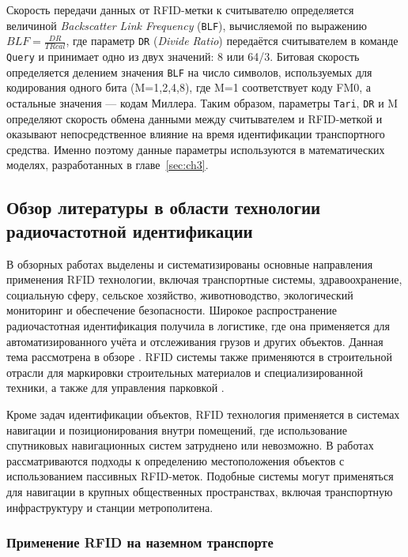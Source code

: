 \documentclass[12pt]{article}
\theoremstyle{definition}
\begin{document}
Скорость передачи данных от RFID-метки к считывателю определяется величиной \textit{Backscatter Link Frequency} (\texttt{BLF}), вычисляемой по выражению \(BLF=\frac{DR}{TRcal}\), где параметр \texttt{DR} (\textit{Divide Ratio}) передаётся считывателем в команде \texttt{Query} и принимает одно из двух значений: 8 или 64/3. Битовая скорость определяется делением значения \texttt{BLF} на число символов, используемых для кодирования одного бита (M=1,2,4,8), где M=1 соответствует коду FM0, а остальные значения — кодам Миллера. Таким образом, параметры \texttt{Tari}, \texttt{DR} и M определяют скорость обмена данными между считывателем и RFID-меткой и оказывают непосредственное влияние на время идентификации транспортного средства. Именно поэтому данные параметры используются в математических моделях, разработанных в главе~\ref{sec:ch3}.

\subsection{Обзор литературы в области технологии радиочастотной идентификации}

В обзорных работах \cite{Jung2015, Kumar2023} выделены и систематизированы основные направления применения RFID технологии, включая транспортные системы, здравоохранение, социальную сферу, сельское хозяйство, животноводство, экологический мониторинг и обеспечение безопасности. Широкое распространение радиочастотная идентификация получила в логистике, где она применяется для автоматизированного учёта и отслеживания грузов и других объектов. Данная тема рассмотрена в обзоре \cite{Casella2022}. RFID системы также применяются в строительной отрасли для маркировки строительных материалов и специализированной техники, а также для управления парковкой \cite{Sharma2020}.

Кроме задач идентификации объектов, RFID технология применяется в системах навигации и позиционирования внутри помещений, где использование спутниковых навигационных систем затруднено или невозможно. В работах \cite{Kunhoth2020, Smith2025, Alvarez-Merino2025} рассматриваются подходы к определению местоположения объектов с использованием пассивных RFID-меток. Подобные системы могут применяться для навигации в крупных общественных пространствах, включая транспортную инфраструктуру и станции метрополитена.

\subsubsection{Применение RFID на наземном транспорте}\label{sec:vehicles}
\end{document}

